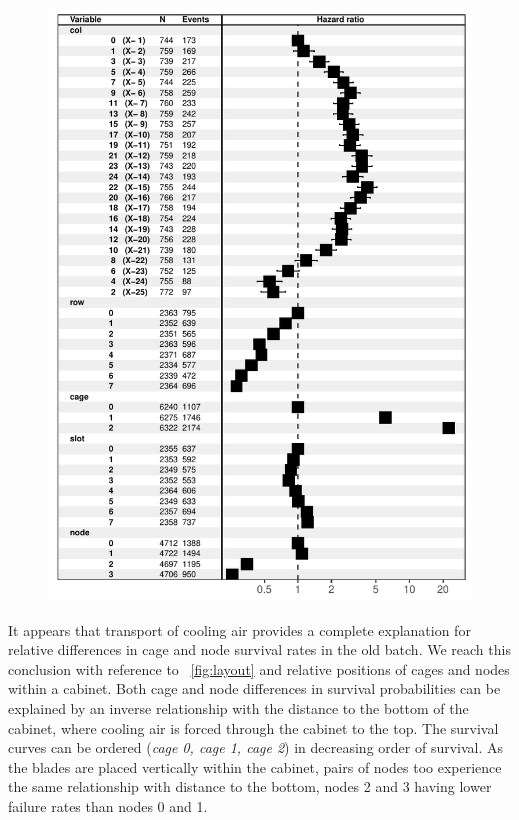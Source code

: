 \begin{figure}[bt]
  \centering
  \includegraphics[width=\columnwidth]{figs/cox_o_t001.pdf}
  \caption{}
  \label{fig:cox-torus}
\end{figure}

It appears that transport of cooling air provides a complete
explanation for relative differences in cage and node survival rates
in the old batch.  We reach this conclusion with reference to
~\ref{fig:layout} and relative positions of cages and nodes
within a cabinet. Both cage and node differences in survival
probabilities can be explained by an inverse relationship with the
distance to the bottom of the cabinet, where cooling air is forced
through the cabinet to the top. The survival curves can be ordered
({\em cage 0, cage 1, cage 2}) in decreasing order of survival. As the
blades are placed vertically within the cabinet, pairs of nodes too
experience the same relationship with distance to the bottom, nodes 2
and 3 having lower failure rates than nodes 0 and 1.

